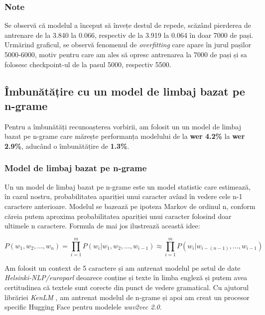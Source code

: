 \subsubsection{Note}
Se observă că modelul a început să învețe destul de repede, scăzând pierderea de antrenare
de la 3.840 la 0.066, respectiv de la 3.919 la 0.064 în doar 7000 de pași. Urmărind graficul,
se observă fenomenul de \textit{overfitting} care apare în jurul pașilor 5000-6000, motiv
pentru care am ales să opresc antrenarea la 7000 de pași și sa folosesc checkpoint-ul de
la pasul 5000, respectiv 5500.




\subsection{Îmbunătățire cu un model de limbaj bazat pe n-grame}
Pentru a îmbunătăți recunoașterea vorbirii, am folosit un un model de limbaj bazat pe n-grame care 
mărește performanța modelului de la \textbf{wer 4.2\%}  la \textbf{wer 2.9\%}, aducând
o îmbunătățire de \textbf{1.3\%}.

\subsubsection{Model de limbaj bazat pe n-grame}
Un un model de limbaj bazat pe n-grame este un model statistic care estimează, în cazul nostru, probabilitatea
apariției unui caracter având în vedere cele n-1 caractere anterioare. Modelul se bazează pe
ipoteza Markov de ordinul n, conform căreia putem aproxima probabilitatea apariției unui caracter
folosind doar ultimele n caractere. Formula de mai jos ilustrează această idee:

\begin{equation}
    P(w_1, w_2, \ldots, w_n) = \prod_{i=1}^{m} P(w_i | w_{1}, w_{2}, \ldots, w_{i-1}) \approx \prod_{i=1}^{m} P(w_i | w_{i-(n-1)}, \ldots, w_{i-1})
\end{equation}
\vspace{1em}

\par
Am folosit un context de 5 caractere și am antrenat modelul pe
setul de date \textit{Helsinki-NLP/europarl} \cite{tiedemann-2012-parallel} deoarece conține și
texte în limba engleză și putem avea certitudinea că textele sunt corecte din punct de vedere
gramatical. Cu ajutorul librăriei \textit{KenLM} \cite{heafield-2011-kenlm}, am antrenat modelul
de n-grame și apoi am creat un procesor specific Hugging Face pentru modelele \textit{wav2vec 2.0}.

